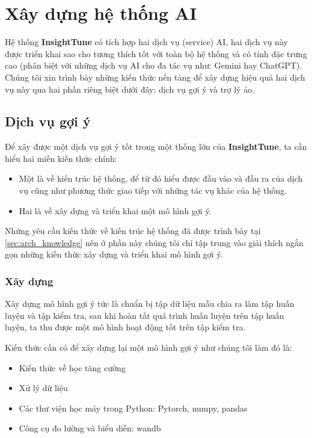 \section{Xây dựng hệ thống AI}

Hệ thống \textbf{InsightTune} có tích hợp hai dịch vụ (service) AI, hai dịch vụ này được triển khai sao cho tương thích tốt với toàn bộ
hệ thống và có tính đặc trưng cao (phân biệt với những dịch vụ AI cho đa tác vụ như: Gemini hay ChatGPT). Chúng tôi xin trình bày
những kiến thức nền tảng để xây dựng hiệu quả hai dịch vụ này qua hai phần riêng biệt dưới đây: dịch vụ gợi ý và trợ lý ảo.

\subsection{Dịch vụ gợi ý}
Để xây được một dịch vụ gợi ý tốt trong một thống lớn của \textbf{InsightTune}, ta cần hiểu hai miền kiến thức chính:
\begin{itemize}
    \item Một là về kiến trúc hệ thống, để từ đó hiểu được đầu vào và đầu ra của dịch vụ cũng như phương thức giao tiếp với những tác vụ khác của hệ thống.
    \item Hai là về xây dựng và triển khai một mô hình gợi ý.
\end{itemize}
Những yêu cầu kiến thức về kiến trúc hệ thống đã được trình bày tại \ref{sec:arch_knowledge} nên ở phần này chúng tôi chỉ tập trung vào giải thích ngắn
gọn những kiến thức xây dựng và triển khai mô hình gợi ý.

\subsubsection{Xây dựng}
Xây dựng mô hình gợi ý tức là chuẩn bị tập dữ liệu mẫu chia ra làm tập huấn luyện và tập kiểm tra, sau khi hoàn tất quá trình huấn luyện
trên tập huấn luyện, ta thu được một mô hình hoạt động tốt trên tập kiểm tra.

Kiến thức cần có để xây dựng lại một mô hình gợi ý như chúng tôi làm đó là:
\begin{itemize}
    \item Kiến thức về học tăng cường
    \item Xử lý dữ liệu
    \item Các thư viện học máy trong Python: Pytorch, numpy, pandas
    \item Công cụ đo lường và biểu diễn: wandb
\end{itemize}

